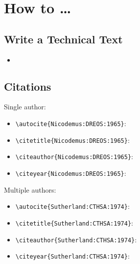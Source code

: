 

\chapter{How to \ldots}
\label{app:how-to}

\section{Write a Technical Text}
\label{app:how-to:write+a+technical+text}

\begin{itemize}
\item {} \autocite{Booth:CR:2008}
\end{itemize}
\par

\section{Citations}
\label{app:how-to:citations}

Single author:
\begin{itemize}
\item \verb!\autocite{Nicodemus:DREOS:1965}!: \autocite{Nicodemus:DREOS:1965}
\item \verb!\citetitle{Nicodemus:DREOS:1965}!: 
\item \verb!\citeauthor{Nicodemus:DREOS:1965}!: \citeauthor{Nicodemus:DREOS:1965}
\item \verb!\citeyear{Nicodemus:DREOS:1965}!: \citeyear{Nicodemus:DREOS:1965}
\end{itemize}
Multiple authors:
\begin{itemize}
\item \verb!\autocite{Sutherland:CTHSA:1974}!: \autocite{Sutherland:CTHSA:1974}
\item \verb!\citetitle{Sutherland:CTHSA:1974}!: 
\item \verb!\citeauthor{Sutherland:CTHSA:1974}!: \citeauthor{Sutherland:CTHSA:1974}
\item \verb!\citeyear{Sutherland:CTHSA:1974}!: \citeyear{Sutherland:CTHSA:1974}
\end{itemize}
\par

